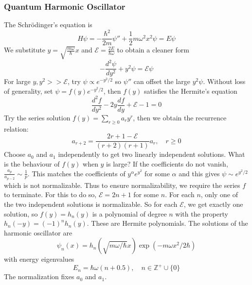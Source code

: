 \documentclass[a4paper]{article}
\begin{document}
\subsubsection*{Quantum Harmonic Oscillator}
\begin{note}
The Schr\"{o}dinger's equation is
$$H\psi=-\frac{\hbar^2}{2m}\psi''+\frac{1}{2}m\omega^2x^2\psi=E\psi$$
We substitute $y=\sqrt{\frac{m\omega}{\hbar}}x$ and $\mathcal{E}=\frac{2E}{\hbar\omega}$ to obtain a cleaner form
$$-\frac{d^2\psi}{dy^2}+y^2\psi=\mathcal{E}\psi$$
For large $y,y^2>>\mathcal{E}$, try $\psi\propto e^{-y^2/2}$ so $\psi''$ can offset the large $y^2\psi$. Without loss of generality, set $\psi=f(y)e^{-y^2/2}$, then $f(y)$ satisfies the Hermite's equation
$$\frac{d^2f}{dy^2}-2y\frac{df}{dy}+\mathcal{E}-1=0$$
Try the series solution $f(y)=\sum_{r\geq0}a_ry^r$, then we obtain the recurrence relation:
$$a_{r+2}=\frac{2r+1-\mathcal{E}}{(r+2)(r+1)}a_r,\quad r\geq0$$
Choose $a_0$ and $a_1$ independently to get two linearly independent solutions. What is the behaviour of $f(y)$ when $y$ is large? If the coefficients do not vanish, $\frac{a_p}{a_{p-2}}\sim\frac{1}{p}$. This matches the coefficients of $y^\alpha e^{y^2}$ for some $\alpha$ and this gives $\psi\sim e^{y^2/2}$ which is not normalizable. Thus to ensure normalizability, we require the series $f$ to terminate. For this to do so, $\mathcal{E}=2n+1$ for some $n$. For each $n$, only one of the two independent solutions is normalizable. So for each $\mathcal{E}$, we get exactly one solution, so $f(y)=h_n(y)$ is a polynomial of degree $n$ with the property $h_n(-y)=(-1)^nh_n(y)$. These are Hermite polynomials. The solutions of the harmonic oscillator are
$$\psi_n(x)=h_n(\sqrt{m\omega/\hbar}x)\exp(-m\omega x^2/2\hbar)$$
with energy eigenvalues
$$E_n=\hbar\omega(n+0.5),\quad n\in\mathbb{Z}^+\cup\{0\}$$
The normalization fixes $a_0$ and $a_1$.
\end{note}
\newpage
\end{document}
